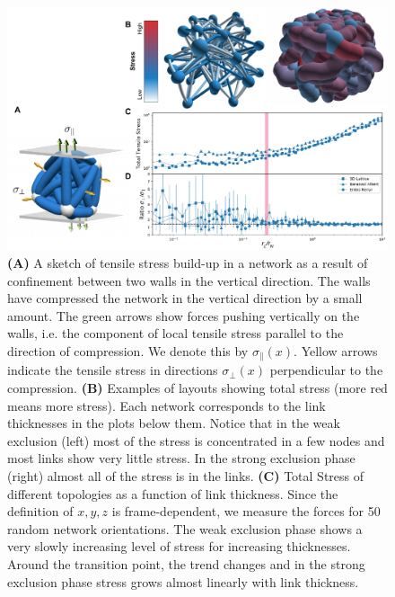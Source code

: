 \documentclass[nofootinbib,preprint,floatfix,titlepage,endfloats]{revtex4} %
\begin{document}
\begin{figure}
    \centering
    \includegraphics[width=1\columnwidth]{fig-09-19/stress-4.pdf}
    \caption{\scriptsize
    {\bf (A)} A sketch of tensile stress build-up in a network as a result of confinement between two walls in the vertical direction. 
    The walls have compressed the network in the vertical direction by a small amount.
    The green arrows show forces pushing vertically on the walls, i.e. the component of local tensile stress parallel to the direction of compression. 
    We denote this by $\sigma_\parallel(x)$. 
    Yellow arrows indicate the tensile stress in directions $\sigma_\perp(x)$
    perpendicular to the compression. 
    {\bf (B)} Examples of layouts showing total stress (more red means more stress).  
    Each network corresponds to the  link thicknesses in the plots below them.
    Notice that in the weak exclusion (left) most of the stress is concentrated in a few nodes and most links show very little stress. 
    In the strong exclusion phase (right) almost all of the stress is in the links. 
    {\bf (C)} Total Stress of different topologies as a function of link thickness. Since the definition of $x,y,z$ is frame-dependent, we measure the forces for 50 random network orientations. 
    The weak exclusion phase shows a very slowly increasing level of stress for increasing thicknesses. %
    Around the transition point, the trend changes and in the strong exclusion phase stress grows almost linearly with link thickness. 
}
\end{figure}
\end{document}

